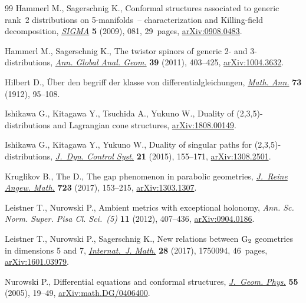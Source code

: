\documentclass[pdftex]{sigma}
\numberwithin{equation}{section}
\begin{document}
\begin{thebibliography}{99}
Hammerl M., Sagerschnig K., Conformal structures associated to generic rank~2
 distributions on 5-manifolds~-- characterization and {K}illing-field
 decomposition, \href{https://doi.org/10.3842/SIGMA.2009.081}{\textit{SIGMA}} \textbf{5} (2009), 081, 29~pages,
 \href{https://arxiv.org/abs/0908.0483}{arXiv:0908.0483}.

Hammerl M., Sagerschnig K., The twistor spinors of generic 2- and
 3-distributions, \href{https://doi.org/10.1007/s10455-010-9240-2}{\textit{Ann. Global Anal. Geom.}} \textbf{39} (2011),
 403--425, \href{https://arxiv.org/abs/1004.3632}{arXiv:1004.3632}.

Hilbert D., \"{U}ber den begriff der klasse von differentialgleichungen,
 \href{https://doi.org/10.1007/BF01456663}{\textit{Math. Ann.}} \textbf{73} (1912), 95--108.

Ishikawa G., Kitagawa Y., Tsuchida A., Yukuno W., Duality of
 (2,3,5)-distributions and {L}agrangian cone structures, \href{https://arxiv.org/abs/1808.00149}{arXiv:1808.00149}.

Ishikawa G., Kitagawa Y., Yukuno W., Duality of singular paths for
 (2,3,5)-distributions, \href{https://doi.org/10.1007/s10883-014-9216-9}{\textit{J.~Dyn. Control Syst.}} \textbf{21} (2015),
 155--171, \href{https://arxiv.org/abs/1308.2501}{arXiv:1308.2501}.

Kruglikov B., The D., The gap phenomenon in parabolic geometries,
 \href{https://doi.org/10.1515/crelle-2014-0072}{\textit{J.~Reine Angew. Math.}} \textbf{723} (2017), 153--215,
 \href{https://arxiv.org/abs/1303.1307}{arXiv:1303.1307}.

Leistner T., Nurowski P., Ambient metrics with exceptional holonomy,
 \textit{Ann. Sc. Norm. Super. Pisa Cl. Sci.~(5)} \textbf{11} (2012),
 407--436, \href{https://arxiv.org/abs/0904.0186}{arXiv:0904.0186}.

Leistner T., Nurowski P., Sagerschnig K., New relations between {${\rm G}_2$}
 geometries in dimensions 5 and 7, \href{https://doi.org/10.1142/S0129167X1750094X}{\textit{Internat.~J. Math.}} \textbf{28}
 (2017), 1750094, 46~pages, \href{https://arxiv.org/abs/1601.03979}{arXiv:1601.03979}.

Nurowski P., Differential equations and conformal structures, \href{https://doi.org/10.1016/j.geomphys.2004.11.006}{\textit{J.~Geom.
 Phys.}} \textbf{55} (2005), 19--49, \href{https://arxiv.org/abs/math.DG/0406400}{arXiv:math.DG/0406400}.


\end{thebibliography}
\end{document}
